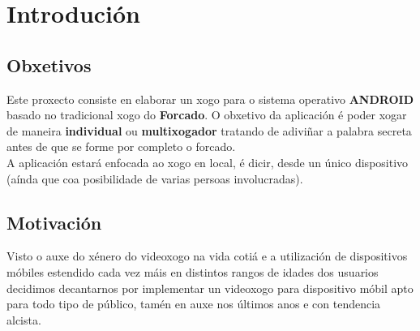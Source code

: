 \chapter{Introdución}
\label{chap:introducion}
\section{Obxetivos}
Este proxecto consiste en elaborar un xogo para o sistema operativo \textbf{ANDROID} basado no tradicional xogo do \textbf{Forcado}. O obxetivo da aplicación é poder xogar de maneira \textbf{individual} ou \textbf{multixogador} tratando de adiviñar a palabra secreta antes de que se forme por completo o forcado.\\
A aplicación estará enfocada ao xogo en local, é dicir, desde un único dispositivo (aínda que coa posibilidade de varias persoas involucradas).
\section{Motivación}
Visto o auxe do xénero do videoxogo na vida cotiá e a utilización de dispositivos móbiles estendido cada vez máis en distintos rangos de idades dos usuarios decidimos decantarnos por implementar un videoxogo para dispositivo móbil apto para todo tipo de público, tamén en auxe nos últimos anos e con tendencia alcista.


